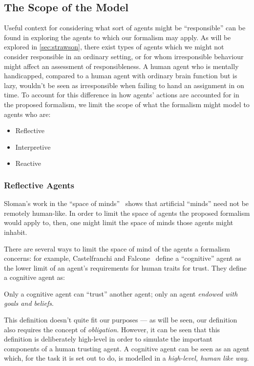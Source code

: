 \subsection{The Scope of the Model}\label{subsec:types-of-agents}
Useful context for considering what sort of agents might be ``responsible'' can be found in exploring the agents to which our formalism may apply. As will be explored in \cref{sec:strawson}, there exist types of agents which we might not consider responsible in an ordinary setting, or for whom irresponsible behaviour might affect an assessment of responsibleness. A human agent who is mentally handicapped, compared to a human agent with ordinary brain function but is lazy, wouldn't be seen as irresponsible when failing to hand an assignment in on time. To account for this difference in how agents' actions are accounted for in the proposed formalism, we limit the scope of what the formalism might model to agents who are:\\
\begin{itemize}
    \item Reflective
    \item Interpretive
    \item Reactive
\end{itemize}

\subsubsection{Reflective Agents}
Sloman's work in the ``space of minds''~\cite{Sloman1984TheMinds} shows that artificial ``minds'' need not be remotely human-like. In order to limit the space of agents the proposed formalism would apply to, then, one might limit the space of minds those agents might inhabit.\par

There are several ways to limit the space of mind of the agents a formalism concerns: for example, Castelfranchi and Falcone~\cite{CastelfranchiSocialApproach} define a ``cognitive'' agent as the lower limit of an agent's requirements for human traits for trust. They define a cognitive agent as:
\begin{displayquote}
    Only a cognitive agent can ``trust'' another agent; only an agent \emph{endowed with goals and beliefs}.
\end{displayquote}\par

This definition doesn't quite fit our purposes --- as will be seen, our definition also requires the concept of \emph{obligation}. However, it can be seen that this definition is deliberately high-level in order to simulate the important components of a human trusting agent. A cognitive agent can be seen as an agent which, for the task it is set out to do, is modelled in a \emph{high-level, human like way}. \par


